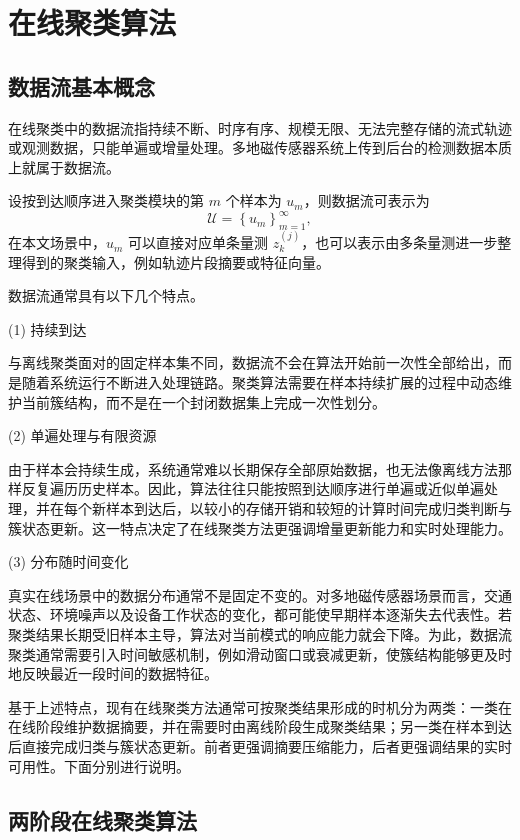\documentclass{xdupgthesis}
\begin{document}
\section{在线聚类算法}

\subsection{数据流基本概念}

在线聚类中的数据流指持续不断、时序有序、规模无限、无法完整存储的流式轨迹或观测数据，只能单遍或增量处理。多地磁传感器系统上传到后台的检测数据本质上就属于数据流。

设按到达顺序进入聚类模块的第 $m$ 个样本为 $u_m$，则数据流可表示为
\begin{equation}
	\mathcal{U}=\left\{u_m\right\}_{m=1}^{\infty},
\end{equation}
在本文场景中，$u_m$ 可以直接对应单条量测 $z_k^{(j)}$，也可以表示由多条量测进一步整理得到的聚类输入，例如轨迹片段摘要或特征向量。

数据流通常具有以下几个特点。

(1) 持续到达

与离线聚类面对的固定样本集不同，数据流不会在算法开始前一次性全部给出，而是随着系统运行不断进入处理链路。聚类算法需要在样本持续扩展的过程中动态维护当前簇结构，而不是在一个封闭数据集上完成一次性划分。

(2) 单遍处理与有限资源

由于样本会持续生成，系统通常难以长期保存全部原始数据，也无法像离线方法那样反复遍历历史样本。因此，算法往往只能按照到达顺序进行单遍或近似单遍处理，并在每个新样本到达后，以较小的存储开销和较短的计算时间完成归类判断与簇状态更新。这一特点决定了在线聚类方法更强调增量更新能力和实时处理能力。

(3) 分布随时间变化


真实在线场景中的数据分布通常不是固定不变的。对多地磁传感器场景而言，交通状态、环境噪声以及设备工作状态的变化，都可能使早期样本逐渐失去代表性。若聚类结果长期受旧样本主导，算法对当前模式的响应能力就会下降。为此，数据流聚类通常需要引入时间敏感机制，例如滑动窗口或衰减更新，使簇结构能够更及时地反映最近一段时间的数据特征。

基于上述特点，现有在线聚类方法通常可按聚类结果形成的时机分为两类：一类在在线阶段维护数据摘要，并在需要时由离线阶段生成聚类结果；另一类在样本到达后直接完成归类与簇状态更新。前者更强调摘要压缩能力，后者更强调结果的实时可用性。下面分别进行说明。

\subsection{两阶段在线聚类算法}
\end{document}
